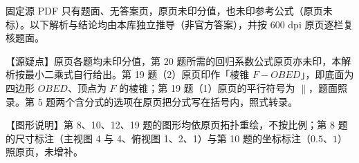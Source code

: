 \begin{gktip}
固定源 PDF 只有题面、无答案页，原页未印分值，也未印参考公式（原页未标）。以下解析与结论均由本库独立推导（非官方答案），并按 600 dpi 原页逐栏复核题面。

【源疑点】原页各题均未印分值，第 20 题所需的回归系数公式原页亦未印，本解析按最小二乘式自行给出。第 19 题（2）原页印作「棱锥 $F-OBED$」，即底面为四边形 $OBED$、顶点为 $F$ 的棱锥；第 19 题（1）原页的平行符号为 $\parallel$，题面照录。第 5 题两个含分式的选项在原页把分式写在括号内，照式转录。

【图形说明】第 8、10、12、19 题的图形均依原页拓扑重绘，不按比例；第 8 题的尺寸标注（主视图 4 与 4、俯视图 1、2、1）与第 10 题的坐标标注（$0.5$、$1$）照原页，未增补。
\end{gktip}


